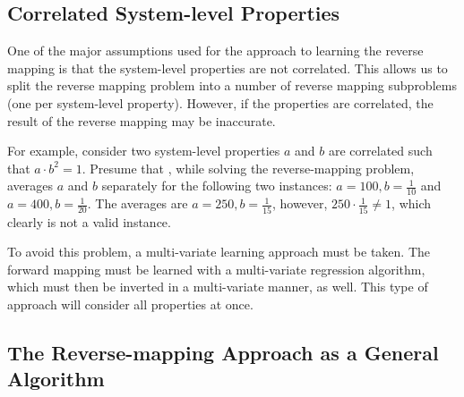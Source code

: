 
\subsection{Correlated System-level Properties}

One of the major assumptions used for the \fw approach to learning the reverse mapping is that the system-level properties are not correlated.
This allows us to split the reverse mapping problem into a number of reverse mapping subproblems (one per system-level property).
However, if the properties are correlated, the result of the reverse mapping may be inaccurate.

For example, consider two system-level properties $a$ and $b$ are correlated such that $a \cdot b^2 = 1$.
Presume that \fw, while solving the reverse-mapping problem, averages $a$ and $b$ separately for the following two instances: $a=100, b=\frac{1}{10}$ and $a=400, b=\frac{1}{20}$.
The averages are $a=250, b=\frac{1}{15}$, however, $250 \cdot \frac{1}{15} \neq 1$, which clearly is not a valid instance.

To avoid this problem, a multi-variate learning approach must be taken.
The forward mapping must be learned with a multi-variate regression algorithm, which must then be inverted in a multi-variate manner, as well.
This type of approach will consider all properties at once.





\subsection{The Reverse-mapping Approach as a General Algorithm}


